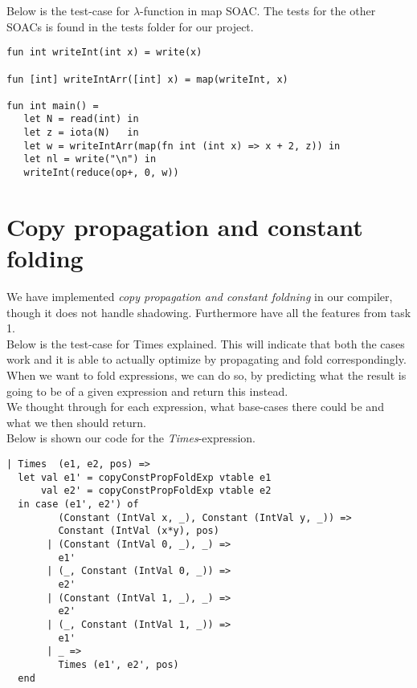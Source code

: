 \documentclass[paper=a4, fontsize=11pt]{scrartcl} %
\numberwithin{equation}{section} %
\numberwithin{figure}{section} %
\numberwithin{table}{section} %
\begin{document}
Below is the test-case for $\lambda$-function in map SOAC. The tests for the other SOACs is found in the tests folder for our project.
\begin{lstlisting}
fun int writeInt(int x) = write(x)

fun [int] writeIntArr([int] x) = map(writeInt, x)

fun int main() =
   let N = read(int) in
   let z = iota(N)   in
   let w = writeIntArr(map(fn int (int x) => x + 2, z)) in
   let nl = write("\n") in
   writeInt(reduce(op+, 0, w))
\end{lstlisting}

\section{Copy propagation and constant folding}

	We have implemented \textit{copy propagation and constant foldning} in our compiler, though it does not handle shadowing. Furthermore have all the features from task 1.\\
Below is the test-case for Times  explained. This will indicate that both the cases work and it is able to actually optimize by propagating and fold correspondingly.\\

When we want to fold expressions, we can do so, by predicting what the result is going to be of a given expression and return this instead.\\
We thought through for each expression, what base-cases there could be and what we then should return.\\

Below is shown our code for the \textit{Times}-expression. 
\begin{lstlisting}
| Times  (e1, e2, pos) =>
  let val e1' = copyConstPropFoldExp vtable e1
      val e2' = copyConstPropFoldExp vtable e2
  in case (e1', e2') of
         (Constant (IntVal x, _), Constant (IntVal y, _)) =>
         Constant (IntVal (x*y), pos)
       | (Constant (IntVal 0, _), _) =>
         e1'
       | (_, Constant (IntVal 0, _)) =>
         e2'
       | (Constant (IntVal 1, _), _) =>
         e2'
       | (_, Constant (IntVal 1, _)) =>
         e1'
       | _ =>
         Times (e1', e2', pos)
  end
\end{lstlisting}
\end{document}
